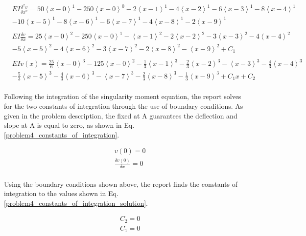 \documentclass[a4paper]{article}
\begin{document}
\begin{equation}
    \begin{split}
& EI \frac{\delta^2 v}{\delta x^2} = 50\left<x-0\right>^1 - 250\left<x-0\right>^0 - 2\left<x-1\right>^1 - 4\left<x-2\right>^1 - 6\left<x-3\right>^1 - 8\left<x-4\right>^1 \\
& - 10\left<x-5\right>^1 -  8\left<x-6\right>^1 - 6\left<x-7\right>^1 -  4\left<x-8\right>^1 - 2\left<x-9\right>^1 \\
& \\
& EI \frac{\delta v}{\delta x} = 25\left<x-0\right>^2 - 250\left<x-0\right>^1 - \left<x-1\right>^2 - 2\left<x-2\right>^2 - 3\left<x-3\right>^2 - 4\left<x-4\right>^2\\
& - 5\left<x-5\right>^2 -  4\left<x-6\right>^2 - 3\left<x-7\right>^2 -  2\left<x-8\right>^2 - \left<x-9\right>^2 + C_1 \\
& \\
& EI v(x) = \frac{25}{6}\left<x-0\right>^3 - 125\left<x-0\right>^2 - \frac{1}{3}\left<x-1\right>^3 - \frac{2}{3}\left<x-2\right>^3 - \left<x-3\right>^3 - \frac{4}{3}\left<x-4\right>^3\\
& - \frac{5}{3}\left<x-5\right>^3  -  \frac{4}{3}\left<x-6\right>^3 - \left<x-7\right>^3 -  \frac{2}{3}\left<x-8\right>^3 - \frac{1}{3}\left<x-9\right>^3  + C_1 x + C_2 \\
    \end{split}
\label{problem4_equations}
\end{equation}

Following the integration of the singularity moment equation, the report solves for the two constants of integration through the use of boundary conditions. As given in the problem description, the fixed at A guarantees the deflection and slope at A is equal to zero, as shown in Eq. \ref{problem4_constants_of_integration}.

\begin{equation}
\begin{split}
	& v(0) = 0 \\
	& \frac{\delta v(0)}{\delta x} = 0 \\
\end{split}
\label{problem4_constants_of_integration}
\end{equation}

Using the boundary conditions shown above, the report finds the constants of integration to the values shown in Eq. \ref{problem4_constants_of_integration_solution}.

\begin{equation}
\begin{split}
	& C_2 = 0 \\
	& C_1 = 0 \\
\end{split}
\label{problem4_constants_of_integration_solution}
\end{equation}
\end{document}
